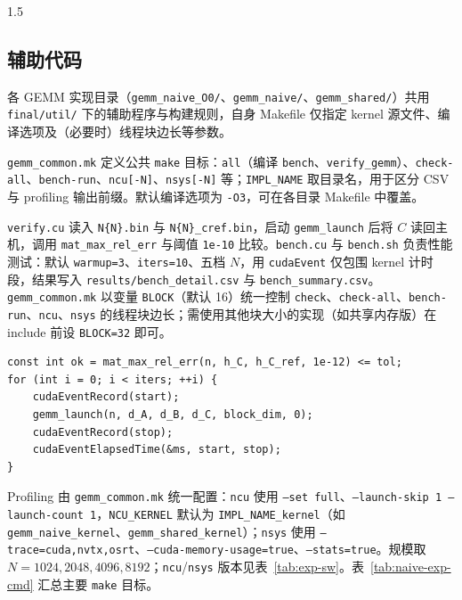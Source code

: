 \documentclass[zihao=-4]{ctexart}
\begin{document}
\begin{spacing}{1.5}
\subsection{辅助代码}

各 GEMM 实现目录（\protect\texttt{gemm\_naive\_O0/}、\protect\texttt{gemm\_naive/}、\protect\texttt{gemm\_shared/}）共用 \protect\texttt{final/util/} 下的辅助程序与构建规则，自身 Makefile 仅指定 kernel 源文件、编译选项及（必要时）线程块边长等参数。

\protect\texttt{gemm\_common.mk} 定义公共 \protect\texttt{make} 目标：\protect\texttt{all}（编译 \protect\texttt{bench}、\protect\texttt{verify\_gemm}）、\protect\texttt{check-all}、\protect\texttt{bench-run}、\protect\texttt{ncu[-N]}、\protect\texttt{nsys[-N]} 等；\protect\texttt{IMPL\_NAME} 取目录名，用于区分 CSV 与 profiling 输出前缀。默认编译选项为 \protect\texttt{-O3}，可在各目录 Makefile 中覆盖。

\protect\texttt{verify.cu} 读入 \protect\texttt{N\{N\}.bin} 与 \protect\texttt{N\{N\}\_cref.bin}，启动 \protect\texttt{gemm\_launch} 后将 $C$ 读回主机，调用 \protect\texttt{mat\_max\_rel\_err} 与阈值 \protect\texttt{1e-10} 比较。\protect\texttt{bench.cu} 与 \protect\texttt{bench.sh} 负责性能测试：默认 \protect\texttt{warmup=3}、\protect\texttt{iters=10}、五档 $N$，用 \protect\texttt{cudaEvent} 仅包围 kernel 计时段，结果写入 \protect\texttt{results/bench\_detail.csv} 与 \protect\texttt{bench\_summary.csv}。\protect\texttt{gemm\_common.mk} 以变量 \protect\texttt{BLOCK}（默认 16）统一控制 \protect\texttt{check}、\protect\texttt{check-all}、\protect\texttt{bench-run}、\protect\texttt{ncu}、\protect\texttt{nsys} 的线程块边长；需使用其他块大小的实现（如共享内存版）在 include 前设 \protect\texttt{BLOCK=32} 即可。

\begin{lstlisting}[caption={校验与计时段（\protect\texttt{mat\_compare.c}、\protect\texttt{bench.cu} 节选）}]
const int ok = mat_max_rel_err(n, h_C, h_C_ref, 1e-12) <= tol;
for (int i = 0; i < iters; ++i) {
    cudaEventRecord(start);
    gemm_launch(n, d_A, d_B, d_C, block_dim, 0);
    cudaEventRecord(stop);
    cudaEventElapsedTime(&ms, start, stop);
}
\end{lstlisting}

Profiling 由 \protect\texttt{gemm\_common.mk} 统一配置：\protect\texttt{ncu} 使用 \protect\texttt{--set full}、\protect\texttt{--launch-skip 1 --launch-count 1}，\protect\texttt{NCU\_KERNEL} 默认为 \protect\texttt{IMPL\_NAME\_kernel}（如 \protect\texttt{gemm\_naive\_kernel}、\protect\texttt{gemm\_shared\_kernel}）；\protect\texttt{nsys} 使用 \protect\texttt{--trace=cuda,nvtx,osrt}、\protect\texttt{--cuda-memory-usage=true}、\protect\texttt{--stats=true}。规模取 $N=1024,2048,4096,8192$；\protect\texttt{ncu}/\protect\texttt{nsys} 版本见表~\ref{tab:exp-sw}。表~\ref{tab:naive-exp-cmd} 汇总主要 \protect\texttt{make} 目标。


\end{spacing}
\end{document}
